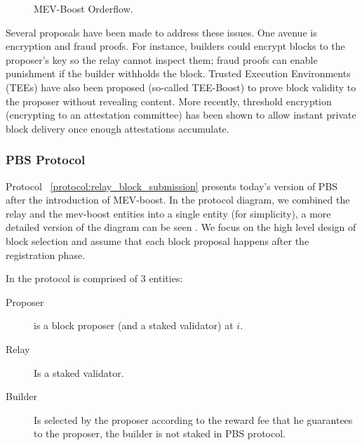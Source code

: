 \begin{figure}[h!]
    \makebox[\textwidth][c]{%
    }
    \label{fig:mev-boost-orderflow}
    \caption{MEV-Boost Orderflow.}
\end{figure}


Several proposals have been made to address these issues.  One avenue is encryption and fraud proofs. For instance, builders could encrypt blocks to the proposer’s key so the relay cannot inspect them; fraud proofs can enable punishment if the builder withholds the block. Trusted Execution Environments (TEEs) have also been proposed (so-called TEE-Boost) to prove block validity to the proposer without revealing content. More recently, threshold encryption (encrypting to an attestation committee) has been shown to allow instant private block delivery once enough attestations accumulate. 

\subsubsection{PBS Protocol}
Protocol ~\ref{protocol:relay_block_submission} presents today's version of PBS after the introduction of MEV-boost. In the protocol diagram, we combined the relay and the mev-boost entities into a single entity (for simplicity), a more detailed version of the diagram can be seen \cite{flashbots_mev_boost_architecture}.
We focus on the high level design of block selection and assume that each block proposal happens after the registration phase.

In the protocol is comprised of 3 entities:
\begin{description}
    \item[Proposer] is a block proposer (and a staked validator) at $i$.
    \item[Relay] Is a staked validator.
    \item[Builder] Is selected by the proposer according to the reward fee that he guarantees to the proposer, the builder is not staked in PBS protocol.
\end{description}

